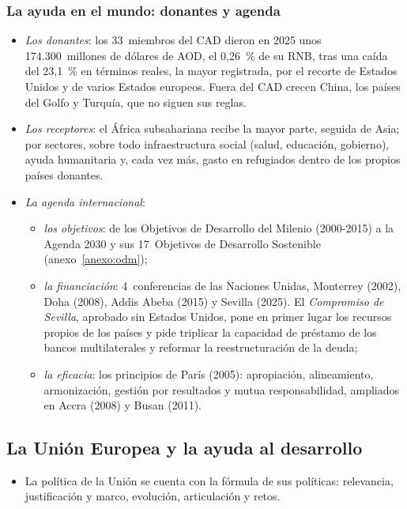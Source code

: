 \documentclass[11pt]{article}
\begin{document}
\subsubsection{La ayuda en el mundo: donantes y agenda}\label{sec:ayuda-mundo}

\begin{itemize}
\item \emph{Los donantes}: los 33~miembros del CAD dieron en 2025 unos 174.300~millones de dólares de AOD, el 0,26~\% de su RNB, tras una caída del 23,1~\% en términos reales, la mayor registrada, por el recorte de Estados Unidos y de varios Estados europeos\nocite{OCDE2026AODPreliminar,OCDE2026DAC1}. Fuera del CAD crecen China, los países del Golfo y Turquía, que no siguen sus reglas.
\item \emph{Los receptores}: el África subsahariana recibe la mayor parte, seguida de Asia; por sectores, sobre todo infraestructura social (salud, educación, gobierno), ayuda humanitaria y, cada vez más, gasto en refugiados dentro de los propios países donantes.
\item \emph{La agenda internacional}:
  \begin{itemize}
  \item \emph{los objetivos}: de los Objetivos de Desarrollo del Milenio (2000-2015) a la Agenda 2030 y sus 17~Objetivos de Desarrollo Sostenible (anexo~\ref{anexo:odm});
  \item \emph{la financiación}: 4~conferencias de las Naciones Unidas, Monterrey (2002), Doha (2008), Addis Abeba (2015) y Sevilla (2025). El \emph{Compromiso de Sevilla}, aprobado sin Estados Unidos, pone en primer lugar los recursos propios de los países y pide triplicar la capacidad de préstamo de los bancos multilaterales y reformar la reestructuración de la deuda\nocite{ONU2025Sevilla};
  \item \emph{la eficacia}: los principios de París (2005): apropiación, alineamiento, armonización, gestión por resultados y mutua responsabilidad, ampliados en Accra (2008) y Busan (2011).
  \end{itemize}
\end{itemize}

\subsection{La Unión Europea y la ayuda al desarrollo}\label{sec:aod-ue}

\begin{itemize}
\item La política de la Unión se cuenta con la fórmula de sus políticas: relevancia, justificación y marco, evolución, articulación y retos.
\end{itemize}
\end{document}
